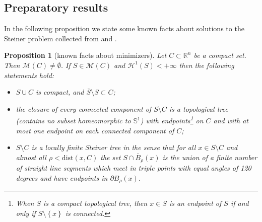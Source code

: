 \documentclass{amsart}
\newcommand{\RR}{\mathbb R}
\renewcommand{\H}{\mathcal H}
\newcommand{\ENCLOSE}[1]{\left\{#1\right\}}
\newcommand{\M}{\mathcal{M}}
\renewcommand{\H}{\mathcal{H}}
\newcommand{\dist}{\mathrm{dist}}
\newtheorem{proposition}[theorem]{Proposition}
\newtheorem{conjecture}[theorem]{Conjecture}
\theoremstyle{definition}
\theoremstyle{remark}
\begin{document}
% 
% 

\subsection{Preparatory results}

In the following proposition we state some known facts about 
solutions to the Steiner problem collected from \cite{PaoSte12}
and \cite{IvaTuz94}.

\begin{proposition}[known facts about minimizers]\label{prop:PaoSte}
  Let $C\subset \RR^n$ be a compact set.
  Then $\M(C)\neq \emptyset$. If $S\in \M(C)$
  and $\H^1(S)<+\infty$
  then the following statements hold:
  \begin{itemize}
    \item[(i)] $S\cup C$ is compact, 
    and $\bar S \setminus S \subset C$;
    \item[(ii)] the closure of every connected component of $S\setminus C$     
    is a topological tree 
    (contains no subset homeomorphic to $\mathbb S^1$)
    with endpoints\footnote{%
    When $S$ is a compact topological tree, then $x\in S$ is an endpoint 
    of $S$ if and only if $S\setminus \ENCLOSE{x}$ is connected.} 
    on $C$ and with at most one endpoint 
    on each connected component of $C$;
    \item[(iii)] $S\setminus C$ is a locally finite Steiner tree in the sense that 
    for all $x\in S\setminus C$ and almost all 
    $\rho < \dist(x,C)$ the set $S\cap \bar B_\rho(x)$ 
    is the union of a finite number of straight line 
    segments which meet in triple points with equal 
    angles of 120 degrees and have endpoints in 
    $\partial B_\rho(x)$.

  \end{itemize}
\end{proposition}
\end{document}
